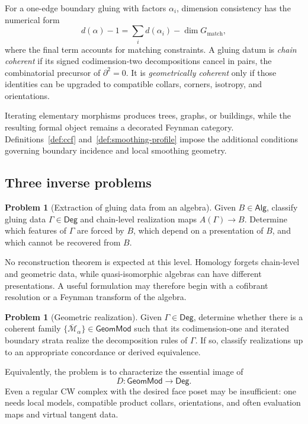 \documentclass[11pt,letterpaper,twoside]{article}
\theoremstyle{plain}
\theoremstyle{definition}
\newtheorem{problem}[theorem]{Problem}
\theoremstyle{remark}
\newcommand{\Alg}{\mathsf{Alg}}
\newcommand{\Deg}{\mathsf{Deg}}
\newcommand{\GeomMod}{\mathsf{GeomMod}}
\newcommand{\overM}{\overline{\mathcal{M}}}
\begin{document}
For a one-edge boundary gluing with factors \(\alpha_i\), dimension consistency has the numerical form
\begin{equation}\label{eq:dim-consistency}
 d(\alpha)-1=\sum_i d(\alpha_i)-\dim G_{\mathrm{match}},
\end{equation}
where the final term accounts for matching constraints.  A gluing datum is \emph{chain coherent} if its signed codimension-two decompositions cancel in pairs, the combinatorial precursor of \(\partial^2=0\).  It is \emph{geometrically coherent} only if those identities can be upgraded to compatible collars, corners, isotropy, and orientations.

Iterating elementary morphisms produces trees, graphs, or buildings, while the resulting formal object remains a decorated Feynman category.  Definitions~\ref{def:ccf} and~\ref{def:smoothing-profile} impose the additional conditions governing boundary incidence and local smoothing geometry.

\subsection{Three inverse problems}

\begin{problem}[Extraction of gluing data from an algebra]\label{prob:i1}
Given \(B\in\Alg\), classify gluing data \(\Gamma\in\Deg\) and chain-level realization maps \(A(\Gamma)\to B\).  Determine which features of \(\Gamma\) are forced by \(B\), which depend on a presentation of \(B\), and which cannot be recovered from \(B\).
\end{problem}

No reconstruction theorem is expected at this level.  Homology forgets chain-level and geometric data, while quasi-isomorphic algebras can have different presentations.  A useful formulation may therefore begin with a cofibrant resolution or a Feynman transform of the algebra.

\begin{problem}[Geometric realization]\label{prob:i2}
Given \(\Gamma\in\Deg\), determine whether there is a coherent family \(\{\overM_\alpha\}\in\GeomMod\) such that its codimension-one and iterated boundary strata realize the decomposition rules of \(\Gamma\).  If so, classify realizations up to an appropriate concordance or derived equivalence.
\end{problem}

Equivalently, the problem is to characterize the essential image of
\[
 D:\GeomMod\longrightarrow\Deg.
\]
Even a regular CW complex with the desired face poset may be insufficient: one needs local models, compatible product collars, orientations, and often evaluation maps and virtual tangent data.
\end{document}
